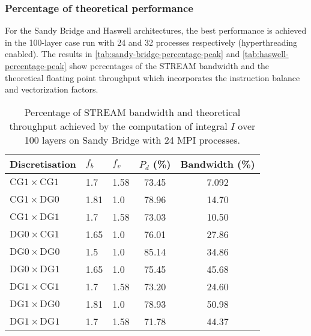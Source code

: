 \documentclass[11pt, a4paper]{scrartcl}
\begin{document}
\subsubsection{Percentage of theoretical performance}
\label{sssec:percentage-theoretical}
For the Sandy Bridge and Haswell architectures, the best performance
is achieved in the 100-layer case run with 24 and 32 processes
respectively (hyperthreading enabled).
The results in \autoref{tab:sandy-bridge-percentage-peak} and
\autoref{tab:haswell-percentage-peak} show percentages of the STREAM
bandwidth and the theoretical floating point throughput which
incorporates the instruction balance and vectorization factors.
\begin{table}[htbp]
\centering
\begin{tabular}{l|l|l|c|c}
Discretisation                     & $f_{b}$ & $f_{v}$ & $P_{d}$ (\%) & Bandwidth (\%) \\
\hline
$\mathrm{CG1} \times \mathrm{CG1}$ & 1.7     & 1.58    & 73.45        & 7.092          \\
$\mathrm{CG1} \times \mathrm{DG0}$ & 1.81    & 1.0     & 78.96        & 14.70          \\
$\mathrm{CG1} \times \mathrm{DG1}$ & 1.7     & 1.58    & 73.03        & 10.50          \\
$\mathrm{DG0} \times \mathrm{CG1}$ & 1.65    & 1.0     & 76.01        & 27.86          \\
$\mathrm{DG0} \times \mathrm{DG0}$ & 1.5     & 1.0     & 85.14        & 34.86          \\
$\mathrm{DG0} \times \mathrm{DG1}$ & 1.65    & 1.0     & 75.45        & 45.68          \\
$\mathrm{DG1} \times \mathrm{CG1}$ & 1.7     & 1.58    & 73.20        & 24.60          \\
$\mathrm{DG1} \times \mathrm{DG0}$ & 1.81    & 1.0     & 78.93        & 50.98          \\
$\mathrm{DG1} \times \mathrm{DG1}$ & 1.7     & 1.58    & 71.78        & 44.37          \\
\end{tabular}
\caption{Percentage of STREAM bandwidth and theoretical throughput
  achieved by the computation of integral $I$ over 100 layers on Sandy
  Bridge with 24 MPI
  processes.\label{tab:sandy-bridge-percentage-peak}}
\end{table}
 
\end{document}
